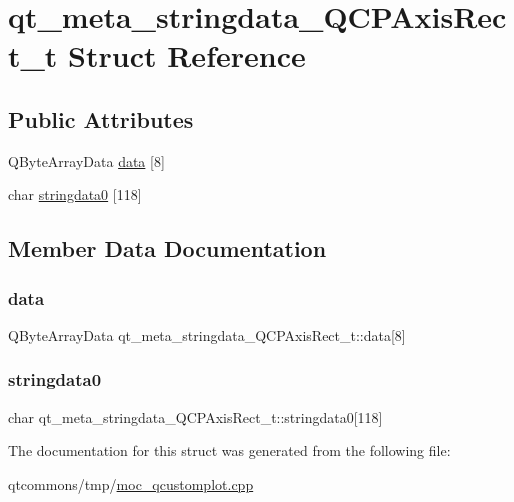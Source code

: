 \hypertarget{structqt__meta__stringdata___q_c_p_axis_rect__t}{}\section{qt\+\_\+meta\+\_\+stringdata\+\_\+\+Q\+C\+P\+Axis\+Rect\+\_\+t Struct Reference}
\label{structqt__meta__stringdata___q_c_p_axis_rect__t}
\subsection*{Public Attributes}
\begin{DoxyCompactItemize}
\item 
Q\+Byte\+Array\+Data \mbox{\hyperlink{structqt__meta__stringdata___q_c_p_axis_rect__t_abe371091541ce1b738a7026d4387d5b2}{data}} \mbox{[}8\mbox{]}
\item 
char \mbox{\hyperlink{structqt__meta__stringdata___q_c_p_axis_rect__t_a7263fed0445758459e2610e1b9fffe05}{stringdata0}} \mbox{[}118\mbox{]}
\end{DoxyCompactItemize}


\subsection{Member Data Documentation}
\mbox{\label{structqt__meta__stringdata___q_c_p_axis_rect__t_abe371091541ce1b738a7026d4387d5b2}} 
\subsubsection{\texorpdfstring{data}{data}}
{\footnotesize\ttfamily Q\+Byte\+Array\+Data qt\+\_\+meta\+\_\+stringdata\+\_\+\+Q\+C\+P\+Axis\+Rect\+\_\+t\+::data\mbox{[}8\mbox{]}}

\mbox{\label{structqt__meta__stringdata___q_c_p_axis_rect__t_a7263fed0445758459e2610e1b9fffe05}} 
\subsubsection{\texorpdfstring{stringdata0}{stringdata0}}
{\footnotesize\ttfamily char qt\+\_\+meta\+\_\+stringdata\+\_\+\+Q\+C\+P\+Axis\+Rect\+\_\+t\+::stringdata0\mbox{[}118\mbox{]}}



The documentation for this struct was generated from the following file\+:\begin{DoxyCompactItemize}
\item 
qtcommons/tmp/\mbox{\hyperlink{moc__qcustomplot_8cpp}{moc\+\_\+qcustomplot.\+cpp}}\end{DoxyCompactItemize}
